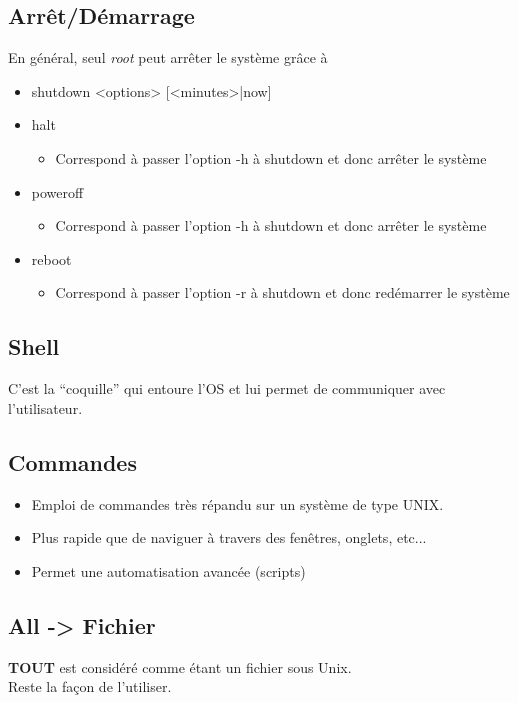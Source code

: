 \documentclass[a4paper]{article}
\begin{document}
    \subsection{Arrêt/Démarrage}
    En général, seul \emph{root} peut arrêter le système grâce à 
    \begin{itemize}[label=\textbullet, font=\Large]
      \item shutdown <options> [{<minutes>|now}]
      \item halt 
      \begin{itemize}[label=, font=\scriptsize]
        \item Correspond à passer l'option -h à shutdown et donc arrêter le système
      \end{itemize}
      \item poweroff
      \begin{itemize}[label=, font=\scriptsize]
        \item Correspond à passer l'option -h à shutdown et donc arrêter le système
      \end{itemize}
      \item reboot
      \begin{itemize}[label=, font=\scriptsize]
        \item Correspond à passer l'option -r à shutdown et donc redémarrer le système
      \end{itemize}
    \end{itemize}

    \subsection{Shell}
    C’est la “coquille” qui entoure l’OS et lui permet de communiquer avec l’utilisateur.

    \subsection{Commandes}
    \begin{itemize}[label=\textbullet, font=\Large]
      \item Emploi de commandes très répandu sur un système de type UNIX.
      \item Plus rapide que de naviguer à travers des fenêtres, onglets, etc...
      \item Permet une automatisation avancée (scripts)
    \end{itemize}

    \subsection{All -> Fichier}
    \textbf{TOUT} est considéré comme étant un fichier sous Unix.\\
    Reste la façon de l'utiliser.
\end{document}
